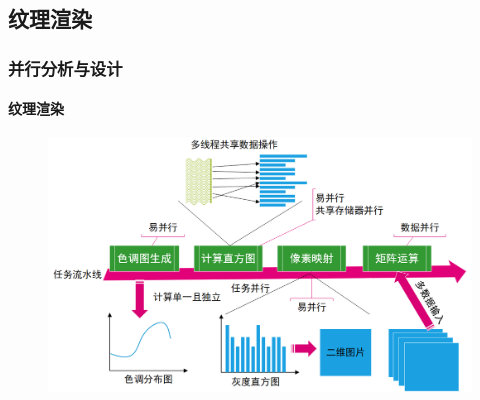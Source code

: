 \documentclass[aspectratio=43, xcolor=svgnames, t, 10pt]{beamer}
\begin{document}
\subsection{纹理渲染}
\begin{frame}
  \frametitle{并行分析与设计}
  \framesubtitle{纹理渲染}
  \begin{figure}
    \includegraphics[width=\linewidth]{./figure/texture_render_design.png}
  \end{figure}
\end{frame}
\end{document}
